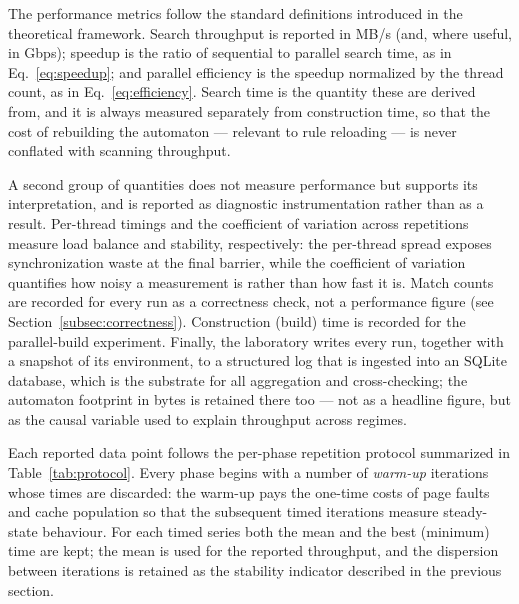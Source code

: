 
The performance metrics follow the standard definitions introduced in the
theoretical framework. Search throughput is reported in MB/s (and, where useful,
in Gbps); speedup is the ratio of sequential to parallel search time, as in
Eq.~\ref{eq:speedup}; and parallel efficiency is the speedup normalized by the
thread count, as in Eq.~\ref{eq:efficiency}. Search time is the quantity these
are derived from, and it is always measured separately from construction time,
so that the cost of rebuilding the automaton --- relevant to rule reloading ---
is never conflated with scanning throughput.

A second group of quantities does not measure performance but supports its
interpretation, and is reported as diagnostic instrumentation rather than as a
result. Per-thread timings and the coefficient of variation across repetitions
measure load balance and stability, respectively: the per-thread spread exposes
synchronization waste at the final barrier, while the coefficient of variation
quantifies how noisy a measurement is rather than how fast it is. Match counts
are recorded for every run as a correctness check, not a performance figure (see
Section~\ref{subsec:correctness}). Construction (build) time is recorded for the
parallel-build experiment. Finally, the laboratory writes every run, together
with a snapshot of its environment, to a structured log that is ingested into an
SQLite database, which is the substrate for all aggregation and cross-checking;
the automaton footprint in bytes is retained there too --- not as a headline
figure, but as the causal variable used to explain throughput across regimes.


Each reported data point follows the per-phase repetition protocol summarized in
Table~\ref{tab:protocol}. Every phase begins with a number of \textit{warm-up}
iterations whose times are discarded: the warm-up pays the one-time costs of
page faults and cache population so that the subsequent timed iterations measure
steady-state behaviour. For each timed series both the mean and the best
(minimum) time are kept; the mean is used for the reported throughput, and the
dispersion between iterations is retained as the stability indicator described in
the previous section.

